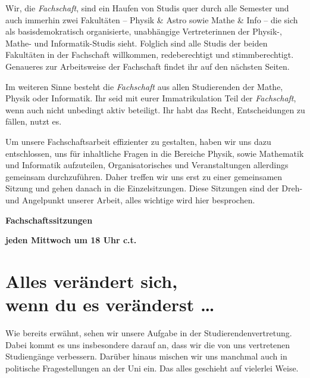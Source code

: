 Wir, die \emph{Fachschaft}, sind ein Haufen von Studis quer durch alle Semester und auch immerhin zwei Fakultäten -- Physik \& Astro sowie Mathe \& Info -- die sich als basisdemokratisch organisierte, unabhängige Vertreterinnen der Physik-, Mathe- und Informatik-Studis sieht. Folglich sind alle Studis der beiden Fakultäten in der Fachschaft willkommen, redeberechtigt und stimmberechtigt. Genaueres zur Arbeitsweise der Fachschaft findet ihr auf den nächsten Seiten.

Im weiteren Sinne besteht die \emph{Fachschaft} aus allen Studierenden der Mathe, Physik oder Informatik. Ihr seid mit eurer Immatrikulation Teil der \emph{Fachschaft}, wenn auch nicht unbedingt aktiv beteiligt. Ihr habt das Recht, Entscheidungen zu fällen, nutzt es.

Um unsere Fachschaftsarbeit effizienter zu gestalten, haben wir uns dazu entschlossen, uns für inhaltliche Fragen in die Bereiche Physik, sowie Mathematik und Informatik aufzuteilen, Organisatorisches und Veranstaltungen allerdings gemeinsam durchzuführen. Daher treffen wir uns erst zu einer gemeinsamen Sitzung und gehen danach in die Einzelsitzungen. Diese Sitzungen sind der Dreh- und Angelpunkt unserer Arbeit, alles wichtige wird hier besprochen.

\begin{center}
    \large \textbf{Fachschaftssitzungen}

    \textbf{jeden Mittwoch um 18 Uhr \gls{c.t.}}

\end{center}
\begin{figure}[b]

\end{figure}

\section[Alles verändert sich, wenn du es veränderst \dots]{Alles verändert sich, \\wenn du es veränderst \dots}
Wie bereits erwähnt, sehen wir unsere Aufgabe in der Studierendenvertretung. Dabei kommt es uns insbesondere darauf an, dass wir die von uns vertretenen Studiengänge verbessern. Darüber hinaus mischen wir uns manchmal auch in politische Fragestellungen an der Uni ein. Das alles geschieht auf vielerlei Weise.

